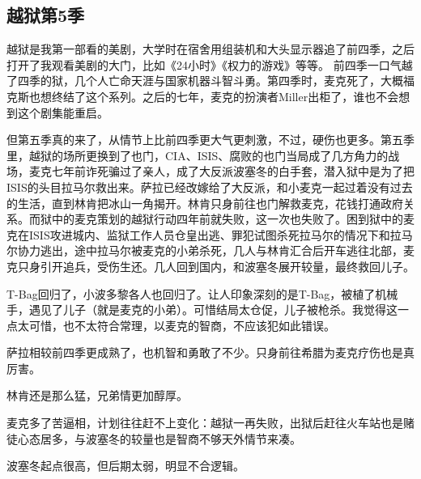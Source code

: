 \subsection{越狱第5季}

越狱是我第一部看的美剧，大学时在宿舍用组装机和大头显示器追了前四季，之后打开了我观看美剧的大门，比如《24小时》《权力的游戏》等等。
前四季一口气越了四季的狱，几个人亡命天涯与国家机器斗智斗勇。第四季时，麦克死了，大概福克斯也想终结了这个系列。之后的七年，麦克的扮演者Miller出柜了，谁也不会想到这个剧集能重启。

但第五季真的来了，从情节上比前四季更大气更刺激，不过，硬伤也更多。第五季里，越狱的场所更换到了也门，CIA、ISIS、腐败的也门当局成了几方角力的战场，麦克七年前诈死骗过了亲人，成了大反派波塞冬的白手套，潜入狱中是为了把ISIS的头目拉马尔救出来。萨拉已经改嫁给了大反派，和小麦克一起过着没有过去的生活，直到林肯把冰山一角揭开。林肯只身前往也门解救麦克，花钱打通政府关系。而狱中的麦克策划的越狱行动四年前就失败，这一次也失败了。困到狱中的麦克在ISIS攻进城内、监狱工作人员仓皇出逃、罪犯试图杀死拉马尔的情况下和拉马尔协力逃出，途中拉马尔被麦克的小弟杀死，几人与林肯汇合后开车逃往北部，麦克只身引开追兵，受伤生还。几人回到国内，和波塞冬展开较量，最终救回儿子。

T-Bag回归了，小波多黎各人也回归了。让人印象深刻的是T-Bag，被植了机械手，遇见了儿子（就是麦克的小弟）。可惜结局太仓促，儿子被枪杀。我觉得这一点太可惜，也不太符合常理，以麦克的智商，不应该犯如此错误。

萨拉相较前四季更成熟了，也机智和勇敢了不少。只身前往希腊为麦克疗伤也是真厉害。

林肯还是那么猛，兄弟情更加醇厚。

麦克多了苦逼相，计划往往赶不上变化：越狱一再失败，出狱后赶往火车站也是赌徒心态居多，与波塞冬的较量也是智商不够天外情节来凑。

波塞冬起点很高，但后期太弱，明显不合逻辑。